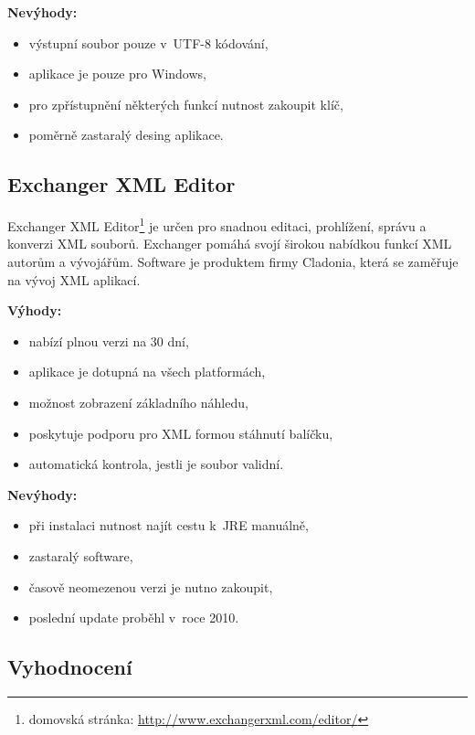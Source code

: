             \textbf{Nevýhody:}
                \begin{itemize}
                    \item výstupní soubor pouze v~UTF-8 kódování,
                    \item aplikace je pouze pro Windows,
                    \item pro zpřístupnění některých funkcí nutnost zakoupit klíč,
                    \item poměrně zastaralý desing aplikace.
                \end{itemize}

        \subsection{Exchanger XML Editor}
            Exchanger XML Editor\footnote{domovská stránka: \url{http://www.exchangerxml.com/editor/}} je určen pro snadnou editaci, prohlížení, správu a konverzi XML souborů. Exchanger pomáhá svojí širokou nabídkou funkcí XML autorům a vývojářům.  Software je produktem firmy Cladonia, která se zaměřuje na vývoj XML aplikací. 
            
            \textbf{Výhody:}
                \begin{itemize}
                    \item nabízí plnou verzi na 30 dní,
                    \item aplikace je dotupná na všech platformách,
                    \item možnost zobrazení základního náhledu,
                    \item poskytuje podporu pro XML formou stáhnutí balíčku,
                    \item automatická kontrola, jestli je soubor validní.
                \end{itemize}
                
            \textbf{Nevýhody:}
                \begin{itemize}
                    \item při instalaci nutnost najít cestu k~JRE manuálně,
                    \item zastaralý software,
                    \item časově neomezenou verzi je nutno zakoupit,
                    \item poslední update proběhl v~roce 2010.
                \end{itemize}
        \subsection{Vyhodnocení}

